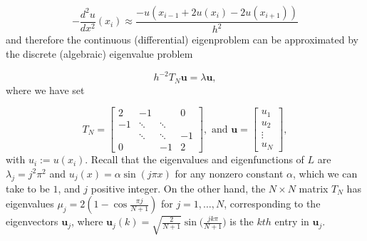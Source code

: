 \documentclass[a4paper,11pt]{article}
\begin{document}
\begin{equation}
	-\frac{d^2u}{dx^2}(x_i) \approx \frac{-u(x_{i-1} + 2 u(x_i)  -2 u(x_{i+1}) )}{h^2}
\end{equation}
and therefore the continuous (differential) eigenproblem can be approximated by the discrete (algebraic) eigenvalue problem 

\begin{equation}\label{key}
	h^{-2} T_N \textbf{u} = \lambda \textbf{u},
\end{equation}
where we have set

\begin{equation}\label{key}
	T_N = \begin{bmatrix}
		2 & -1 &  & 0 \\
		-1 & \ddots  & \ddots  &  \\
		& \ddots & \ddots & -1 \\
		0 &  & -1 & 2
	\end{bmatrix}, \text{ and } \textbf{u} = \begin{bmatrix}
		u_1\\
		u_2\\
		\vdots\\
		u_N
	\end{bmatrix},
\end{equation}
with $u_i := u(x_i)$. Recall that the eigenvalues and eigenfunctions of $L$ are $\lambda_j = j^2\pi^2$ and $u_j(x) = \alpha \sin(j\pi x)$ for any nonzero constant $\alpha$, which we can take to be $1$, and $j$ positive integer. On the other hand, the $N \times N$ matrix $T_N$ has eigenvalues $\mu_j = 2(1- \cos \frac{\pi j }{N+1})$ for $j = 1, \dots, N$, corresponding to the eigenvectors $\textbf{u}_j$, where $\textbf{u}_j(k) = \sqrt{\frac{2}{N+1}} \sin\big( \frac{j k \pi}{N+1} \big)$ is the $kth$ entry in $\textbf{u}_j$.

\end{document}
